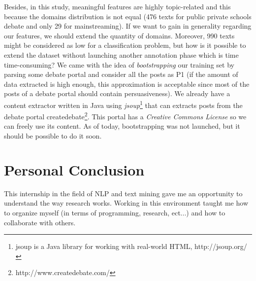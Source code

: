 Besides, in this study, meaningful features are highly topic-related and this because the domains distribution is not equal (476 texts for public private schools debate and only 29 for mainstreaming). If we want to gain in generality regarding our features, we should extend the quantity of domains. Moreover, 990 texts might be considered as low for a classification problem, but how is it possible to extend the dataset without launching another annotation phase which is time time-consuming? We came with the idea of \emph{bootstrapping} our training set by parsing some debate portal and consider all the posts as P1 (if the amount of data extracted is high enough, this approximation is acceptable since most of the posts of a debate portal should contain persuasiveness). We already have a content extractor written in Java using \emph{jsoup}\footnote{jsoup is a Java library for working with real-world HTML, http://jsoup.org/} that can extracts posts from the debate portal createdebate\footnote{http://www.createdebate.com/}. This portal has a \emph{Creative Commons License} so we can freely use its content. As of today, bootstrapping was not launched, but it should be possible to do it soon.

\section{Personal Conclusion}
This internship in the field of NLP and text mining gave me an opportunity to understand the way research works. Working in this environment taught me how to organize myself (in terms of programming, research, ect...) and how to collaborate with others.
